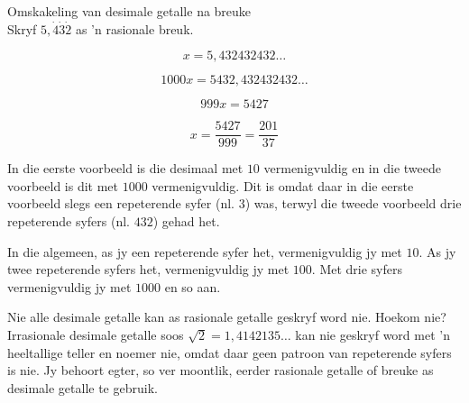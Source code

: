 \clearpage
\begin{wex}
{%
Omskakeling van desimale getalle na breuke
}
{%
\\Skryf $5,\dot{4}\dot{3}\dot{2}$ as 'n rasionale breuk.
}
{%


$$ x = 5,432432432\ldots $$


$$ 1000x = 5432,432432432\ldots $$


$$ 999x = 5427 $$


$$ x = \dfrac{5427}{999} = \dfrac{201}{37} $$

}
\end{wex}

In die eerste voorbeeld is die desimaal met $10$  vermenigvuldig en in die tweede voorbeeld is dit met $1000$ vermenigvuldig. Dit is omdat daar in die eerste voorbeeld slegs een repeterende syfer (nl. $3$) was, terwyl die tweede voorbeeld drie repeterende syfers (nl. $432$) gehad het.\par 
In die algemeen, as jy een repeterende syfer het, vermenigvuldig jy met $10$.  As jy twee repeterende syfers het, vermenigvuldig jy met $100$.  Met drie syfers vermenigvuldig jy met $1000$ en so aan.\clearpage

Nie alle desimale getalle kan as rasionale getalle geskryf word nie. Hoekom nie? Irrasionale desimale getalle soos
$\sqrt{2}=1,4142135\ldots$
kan nie geskryf word met ’n heeltallige teller en noemer nie, omdat daar geen patroon van repeterende syfers is nie. Jy behoort egter, so ver moontlik, eerder rasionale getalle of breuke as desimale getalle te gebruik.






